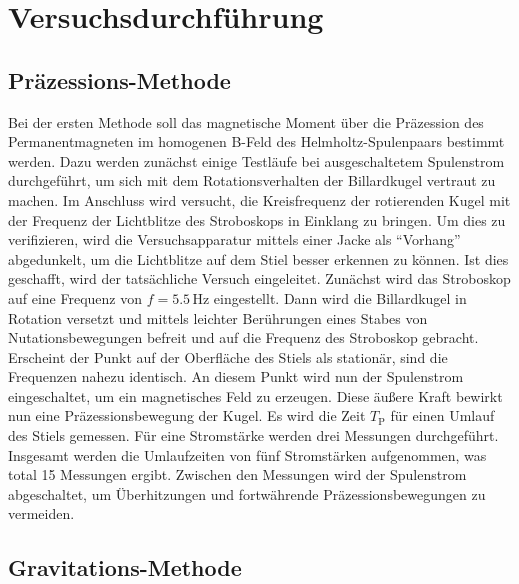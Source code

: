 \section{Versuchsdurchführung}
\subsection{Präzessions-Methode}

\noindent Bei der ersten Methode soll das magnetische Moment über die Präzession des Permanentmagneten im homogenen 
B-Feld des Helmholtz-Spulenpaars bestimmt werden. Dazu werden zunächst einige Testläufe bei ausgeschaltetem Spulenstrom 
durchgeführt, um sich mit dem Rotationsverhalten der Billardkugel vertraut zu machen. Im Anschluss wird versucht, die Kreisfrequenz 
der rotierenden Kugel mit der Frequenz der Lichtblitze des Stroboskops in Einklang zu bringen. Um dies zu verifizieren, wird 
die Versuchsapparatur mittels einer Jacke als \enquote{Vorhang} abgedunkelt, um die Lichtblitze auf dem Stiel besser 
erkennen zu können. Ist dies geschafft, wird der tatsächliche Versuch eingeleitet. Zunächst wird das Stroboskop auf eine 
Frequenz von $f = 5.5\,\unit{\hertz}$ eingestellt. Dann wird die Billardkugel in Rotation versetzt und mittels leichter
Berührungen eines Stabes von Nutationsbewegungen befreit und auf die Frequenz des Stroboskop gebracht. Erscheint der Punkt auf 
der Oberfläche des Stiels als stationär, sind die Frequenzen nahezu identisch. An diesem Punkt wird nun der Spulenstrom 
eingeschaltet, um ein magnetisches Feld zu erzeugen. Diese äußere Kraft bewirkt nun eine Präzessionsbewegung der Kugel. Es wird 
die Zeit $T_\text{P}$ für einen Umlauf des Stiels gemessen. Für eine Stromstärke werden drei Messungen durchgeführt. Insgesamt werden 
die Umlaufzeiten von fünf Stromstärken aufgenommen, was total 15 Messungen ergibt. Zwischen den Messungen wird der Spulenstrom 
abgeschaltet, um Überhitzungen und fortwährende Präzessionsbewegungen zu vermeiden.

\subsection{Gravitations-Methode}

